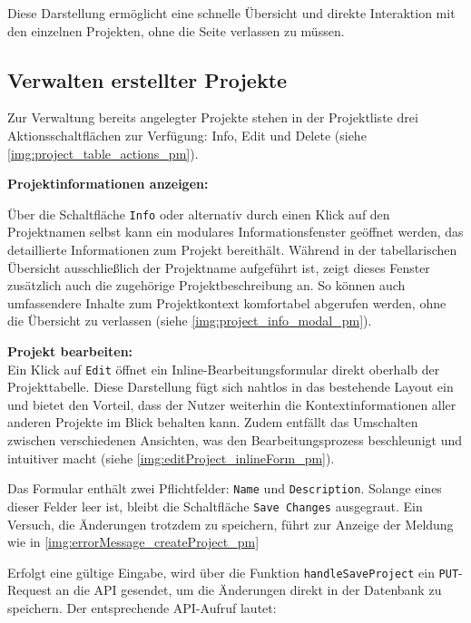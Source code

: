 
Diese Darstellung ermöglicht eine schnelle Übersicht und direkte Interaktion mit den einzelnen Projekten, ohne die Seite verlassen zu müssen.

\subsection*{Verwalten erstellter Projekte}

Zur Verwaltung bereits angelegter Projekte stehen in der Projektliste drei Aktionsschaltflächen zur Verfügung: Info, Edit und Delete (siehe \autoref{img:project_table_actions_pm}).

\textbf{Projektinformationen anzeigen:}

Über die Schaltfläche \texttt{Info} oder alternativ durch einen Klick auf den Projektnamen selbst kann ein modulares Informationsfenster geöffnet werden, das detaillierte Informationen zum Projekt bereithält. Während in der tabellarischen Übersicht ausschließlich der Projektname aufgeführt ist, zeigt dieses Fenster zusätzlich auch die zugehörige Projektbeschreibung an. So können auch umfassendere Inhalte zum Projektkontext komfortabel abgerufen werden, ohne die Übersicht zu verlassen (siehe \autoref{img:project_info_modal_pm}).


\textbf{Projekt bearbeiten:}\\
Ein Klick auf \texttt{Edit} öffnet ein Inline-Bearbeitungsformular direkt oberhalb der Projekttabelle. Diese Darstellung fügt sich nahtlos in das bestehende Layout ein und bietet den Vorteil, dass der Nutzer weiterhin die Kontextinformationen aller anderen Projekte im Blick behalten kann. Zudem entfällt das Umschalten zwischen verschiedenen Ansichten, was den Bearbeitungsprozess beschleunigt und intuitiver macht (siehe \autoref{img:editProject_inlineForm_pm}).


Das Formular enthält zwei Pflichtfelder: \texttt{Name} und \texttt{Description}. Solange eines dieser Felder leer ist, bleibt die Schaltfläche \texttt{Save Changes} ausgegraut. Ein Versuch, die Änderungen trotzdem zu speichern, führt zur Anzeige der Meldung wie in \autoref{img:errorMessage_createProject_pm}

\newpage
Erfolgt eine gültige Eingabe, wird über die Funktion \texttt{handleSaveProject} ein \texttt{PUT}-Request an die API gesendet, um die Änderungen direkt in der Datenbank zu speichern. Der entsprechende API-Aufruf lautet:

